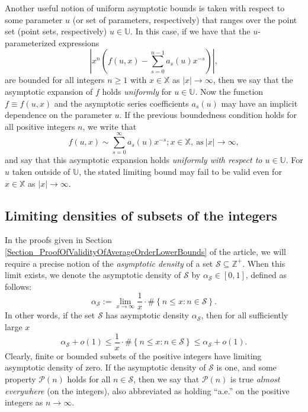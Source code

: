 \documentclass[11pt,reqno,a4letter]{article}
\numberwithin{figure}{section}
\numberwithin{table}{section}
\theoremstyle{plain}
\numberwithin{theorem}{section}
\theoremstyle{definition}
\begin{document}
Another useful notion of uniform asymptotic bounds is taken with respect to some parameter $u$ 
(or set of parameters, respectively) that ranges over the point set (point sets, respectively) 
$u \in \mathbb{U}$. In this case, if we have that the $u$-parameterized expressions 
\[
\left\lvert x^n\left(f(u, x) - \sum_{s=0}^{n-1} a_s(u) x^{-s}\right) \right\rvert, 
\]
are bounded for all integers $n \geq 1$ with $x \in \mathbb{X}$ as 
$|x| \rightarrow \infty$, then we say that 
the asymptotic expansion of $f$ holds \emph{uniformly} for $u \in \mathbb{U}$. 
Now the function $f \equiv f(u, x)$ and the 
asymptotic series coefficients $a_s(u)$ may have an implicit dependence on the parameter $u$. 
If the previous boundedness condition holds for all positive integers $n$, we write that 
\[
f(u, x) \sim \sum_{s=0}^{\infty} a_s(u) x^{-s}; x \in \mathbb{X}, \mathrm{\ as \ } |x| \rightarrow \infty, 
\]
and say that this asymptotic expansion holds \emph{uniformly with respect to $u \in \mathbb{U}$}. 
For $u$ taken outside of $\mathbb{U}$, the stated limiting 
bound may fail to be valid even for $x \in \mathbb{X}$ as 
$|x| \rightarrow \infty$. 

\subsection{Limiting densities of subsets of the integers} 

In the proofs given in Section \ref{Section_ProofOfValidityOfAverageOrderLowerBounds} 
of the article, we will require a precise notion of the 
\emph{asymptotic density} of a set $\mathcal{S} \subseteq \mathbb{Z}^{+}$. 
When this limit exists, we denote the asymptotic density of 
$\mathcal{S}$ by $\alpha_{\mathcal{S}} \in [0, 1]$, defined as follows: 
\[
\alpha_{\mathcal{S}} := \lim_{x \rightarrow \infty} \frac{1}{x} \cdot \#\left\{ 
     n \leq x: n \in \mathcal{S} 
     \right\}. 
\]
In other words, if the set $\mathcal{S}$ has asymptotic density $\alpha_{\mathcal{S}}$, then 
for all sufficiently large $x$ 
\[
\alpha_{\mathcal{S}} + o(1) \leq \frac{1}{x} \cdot \#\left\{ 
     n \leq x: n \in \mathcal{S} \right\} \leq 
     \alpha_{\mathcal{S}} + o(1). 
\]
Clearly, finite or bounded subsets of the positive integers have limiting asymptotic density of zero. 
If the asymptotic density of $\mathcal{S}$ is one, and some property $\mathcal{P}(n)$ holds 
for all $n \in \mathcal{S}$, then we say that $\mathcal{P}(n)$ is true 
\emph{almost everywhere} (on the integers), also abbreviated as holding ``a.e.'' on the positive integers 
as $n \rightarrow \infty$. 
\end{document}
